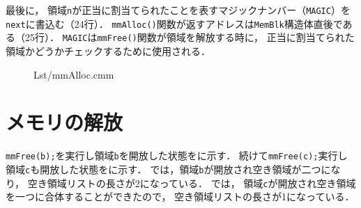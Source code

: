 最後に，
領域{\tt n}が正当に割当てられたことを表すマジックナンバー（{\tt MAGIC}）を
{\tt next}に書込む（24行）．
{\tt mmAlloc()}関数が返すアドレスは{\tt MemBlk}構造体直後である（25行）．
{\tt MAGIC}は{\tt mmFree()}関数が領域を解放する時に，
正当に割当てられた領域かどうかチェックするために使用される．

\begin{figure}[btph]
  
                  {Lst/mmAlloc.cmm}
\end{figure}

\section{メモリの解放}
{\tt mmFree(b);}を実行し領域{\tt b}を開放した状態をに示す．
続けて{\tt mmFree(c);}実行し領域{\tt c}も開放した状態をに示す．
では，領域{\tt b}が開放され空き領域が二つになり，
空き領域リストの長さが2になっている．
では，
領域{\tt c}が開放され空き領域を一つに合体することができたので，
空き領域リストの長さが1になっている．

